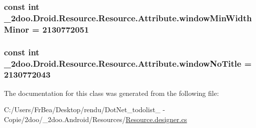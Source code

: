\hypertarget{class__2doo_1_1_droid_1_1_resource_1_1_attribute_459ccd232f91b23deccbc0b8847e8fd8}{
\subsubsection[{windowMinWidthMinor}]{\setlength{\rightskip}{0pt plus 5cm}const int \_\-2doo.Droid.Resource.Resource.Attribute.windowMinWidthMinor = 2130772051}}
\label{class__2doo_1_1_droid_1_1_resource_1_1_attribute_459ccd232f91b23deccbc0b8847e8fd8}


\hypertarget{class__2doo_1_1_droid_1_1_resource_1_1_attribute_5c68227dee7a85db47b0fc1face6221c}{
\subsubsection[{windowNoTitle}]{\setlength{\rightskip}{0pt plus 5cm}const int \_\-2doo.Droid.Resource.Resource.Attribute.windowNoTitle = 2130772043}}
\label{class__2doo_1_1_droid_1_1_resource_1_1_attribute_5c68227dee7a85db47b0fc1face6221c}




The documentation for this class was generated from the following file:\begin{CompactItemize}
\item 
C:/Users/FrBea/Desktop/rendu/DotNet\_\-todolist\_ - Copie/2doo/\_\-2doo.Android/Resources/\hyperlink{_resource_8designer_8cs}{Resource.designer.cs}\end{CompactItemize}
